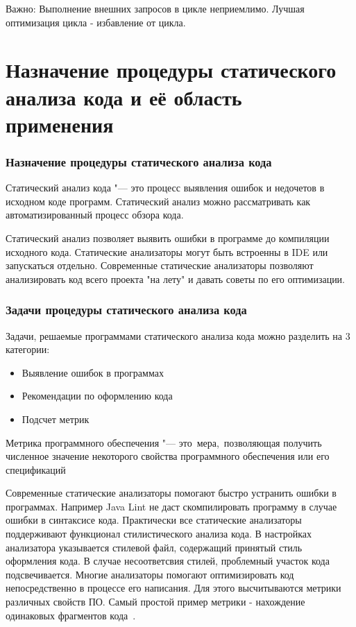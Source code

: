 \documentclass{../industrial-development}
\begin{document}
Важно:
Выполнение внешних запросов в цикле неприемлимо. Лучшая оптимизация цикла - избавление от цикла.

\section{Назначение процедуры статического анализа кода и её область применения}

\begin{frame} \frametitle{Назначение процедуры статического анализа кода}
	\begin{block}{}
		Статический анализ кода "--- это процесс выявления ошибок и недочетов в исходном коде программ. Статический анализ можно рассматривать как автоматизированный процесс обзора кода.
	\end{block}
\end{frame}
\lecturenotes
Статический анализ позволяет выявить ошибки в программе до компиляции исходного кода. Статические анализаторы могут быть встроенны в IDE или запускаться отдельно. Современные статические анализаторы позволяют анализировать код всего проекта "на лету" и давать советы по его оптимизации.

\begin{frame} \frametitle{Задачи процедуры статического анализа кода}
	\begin{block}{}
		Задачи, решаемые программами статического анализа кода можно разделить на 3 категории:
	\end{block}
	
	\begin{itemize}
		\item Выявление ошибок в программах
		\item Рекомендации по оформлению кода
		\item Подсчет метрик
	\end{itemize}

	\begin{block}{}
		Метрика программного обеспечения "--- это~мера,~позволяющая получить численное значение некоторого свойства программного обеспечения или его спецификаций
	\end{block}
	
\end{frame}
\lecturenotes
Современные статические анализаторы помогают быстро устранить ошибки в программах. Например Java Lint не даст скомпилировать программу в случае ошибки в синтаксисе кода. Практически все статические анализаторы поддерживают функционал стилистического анализа кода. В настройках анализатора указывается стилевой файл, содержащий принятый стиль оформления кода. В случае несоответсвия стилей, проблемный участок кода подсвечивается. Многие анализаторы помогают оптимизировать код непосредственно в процессе его написания. Для этого высчитываются метрики различных свойств ПО. Самый простой пример метрики - нахождение одинаковых фрагментов кода~\cite{StaticAnalisysMain}.
\end{document}
